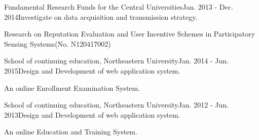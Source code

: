 \documentclass{joel_cv}
\begin{document}
\begin{sectionContentNormal}{Fundamental Research Funds for the Central Universities}{Jan. 2013 - Dec. 2014}{Investigate on data acquisition and transmission strategy.}
	\item Research on Reputation Evaluation and User Incentive Schemes in Participatory Sensing Systems(No. N120417002)
\end{sectionContentNormal}

\begin{sectionContentNormal}{School of continuing education, Northeastern University}{Jan. 2014 - Jun. 2015}{Design and Development of web application system.}
	\item An online Enrollment Examination System.
\end{sectionContentNormal}

\begin{sectionContentNormal}{School of continuing education, Northeastern University}{Jan. 2012 - Jun. 2013}{Design and Development of web application system.}
	\item An online Education and Training System.
\end{sectionContentNormal}
\end{document}
